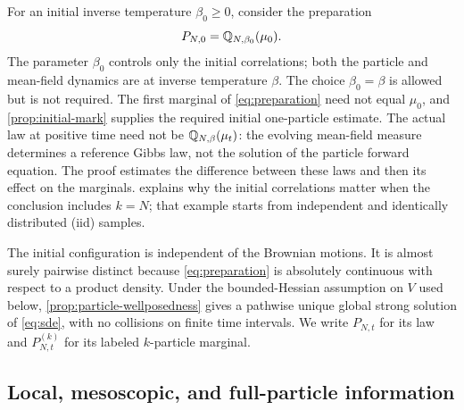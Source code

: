 \documentclass[11pt,reqno]{amsart}
\numberwithin{equation}{section}
\theoremstyle{plain}
\theoremstyle{remark}
\begin{document}
For an initial inverse temperature $\beta_0\ge0$, consider the preparation
\begin{equation}\label{eq:preparation}
 P_{N,0}=\mathbb Q_{N,\beta_0}(\mu_0).
\end{equation}
{The parameter $\beta_0$ controls only the initial correlations; both the particle and mean-field dynamics are at inverse temperature $\beta$.} The choice $\beta_0=\beta$ is allowed but is not required. The first marginal of \eqref{eq:preparation} need not equal $\mu_0$, and \cref{prop:initial-mark} supplies the required initial one-particle estimate. The actual law at positive time need not be $\mathbb Q_{N,\beta}(\mu_t)$: the evolving mean-field measure determines a reference Gibbs law, not the solution of the particle forward equation. The proof estimates the difference between these laws and then its effect on the marginals.  explains why the initial correlations matter when the conclusion includes $k=N$; that example starts from independent and identically distributed (iid) samples.


The initial configuration is independent of the Brownian motions. It is almost surely pairwise distinct because \eqref{eq:preparation} is absolutely continuous with respect to a product density. Under the bounded-Hessian assumption on $V$ used below, \cref{prop:particle-wellposedness} gives a pathwise unique global strong solution of \eqref{eq:sde}, with no collisions on finite time intervals. We write $P_{N,t}$ for its law and $P_{N,t}^{(k)}$ for its labeled $k$-particle marginal.

\subsection{Local, mesoscopic, and full-particle information}\label{sec:intro-scales}
\end{document}
